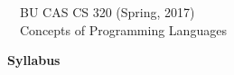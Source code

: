 \documentclass[11pt]{article}
\begin{document}
\begin{flushright}
\begin{minipage}{430pt}
{
\begin{flushleft}
{~~\large\sc BU CAS CS 320 (Spring, 2017)} \\
{~~\LARGE\sc Concepts of Programming Languages}
\end{flushleft}
}
\end{minipage}
\end{flushright}

\vspace{12pt}
\begin{center}
\begin{minipage}{16cm}
\begin{center}
{\LARGE\bf Syllabus} \\[12pt]
\end{center}
\end{minipage}
\end{center}

\thispagestyle{empty}
\end{document}
